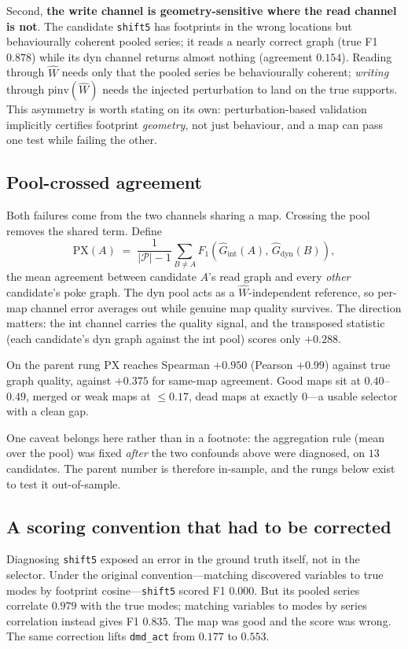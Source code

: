 Second, \textbf{the write channel is geometry-sensitive where the read channel is
not}. The candidate \texttt{shift5} has footprints in the wrong locations but
behaviourally coherent pooled series; it reads a nearly correct graph
(true F1 $0.878$) while its dyn channel returns almost nothing (agreement
$0.154$). Reading through $\hat W$ needs only that the pooled series be
behaviourally coherent; \emph{writing} through $\mathrm{pinv}(\hat W)$ needs the
injected perturbation to land on the true supports. This asymmetry is worth
stating on its own: perturbation-based validation implicitly certifies footprint
\emph{geometry}, not just behaviour, and a map can pass one test while failing the
other.

\subsection{Pool-crossed agreement}

Both failures come from the two channels sharing a map. Crossing the pool removes
the shared term. Define
\[
  \mathrm{PX}(A) \;=\; \frac{1}{|\mathcal{P}|-1}\sum_{B \neq A}
  F_1\!\left(\hat G_{\text{int}}(A),\, \hat G_{\text{dyn}}(B)\right),
\]
the mean agreement between candidate $A$'s read graph and every \emph{other}
candidate's poke graph. The dyn pool acts as a $\hat W$-independent reference, so
per-map channel error averages out while genuine map quality survives. The
direction matters: the int channel carries the quality signal, and the transposed
statistic (each candidate's dyn graph against the int pool) scores only $+0.288$.

On the parent rung PX reaches Spearman $+0.950$ (Pearson $+0.99$) against true
graph quality, against $+0.375$ for same-map agreement. Good maps sit at
$0.40$--$0.49$, merged or weak maps at $\le 0.17$, dead maps at exactly $0$---a
usable selector with a clean gap.

One caveat belongs here rather than in a footnote: the aggregation rule
(mean over the pool) was fixed \emph{after} the two confounds above were
diagnosed, on $13$ candidates. The parent number is therefore in-sample, and the
rungs below exist to test it out-of-sample.

\subsection{A scoring convention that had to be corrected}

Diagnosing \texttt{shift5} exposed an error in the ground truth itself, not in the
selector. Under the original convention---matching discovered variables to true
modes by footprint cosine---\texttt{shift5} scored F1 $0.000$. But its pooled
series correlate $0.979$ with the true modes; matching variables to modes by
series correlation instead gives F1 $0.835$. The map was good and the score was
wrong. The same correction lifts \texttt{dmd\_act} from $0.177$ to $0.553$.

